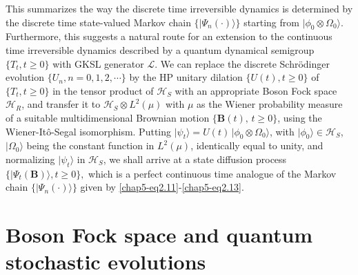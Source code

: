 This summarizes the way the discrete time irreversible dynamics  is determined by the discrete time state-valued Markov chain $\{\vert\Psi_n(\cdot)\rangle\}$ starting from $\vert\phi_0 \otimes \Omega_0\rangle$.  Furthermore, this suggests a natural route for an extension to the continuous time irreversible dynamics described by a quantum dynamical semigroup $\{T_t, t\geq 0\}$ with GKSL generator $\mathcal{L}$. We can replace the discrete Schr{\"o}dinger evolution $\{U_n, n=0,1,2,\cdots\}$ by the HP unitary dilation $\{U(t), t\geq 0\}$ of $\{T_t, t\geq 0\}$ in the tensor product of $\mathcal{H}_S$ with an appropriate Boson Fock space $\mathcal{H}_R$, and transfer it to $\mathcal{H}_S\otimes L^2(\mu)$ with $\mu$ as the Wiener probability measure of a suitable multidimensional Brownian motion $\{\mathbf{B}(t),\, t\geq 0\}$, using the Wiener-It{\^o}-Segal isomorphism. Putting $\vert\psi_t\rangle=U(t)\, \vert \phi_0\otimes \Omega_0\rangle$, with $\vert\phi_0\rangle\in \mathcal{H}_S$, $\vert\Omega_0\rangle$ being the constant function in $L^2(\mu)$, identically equal to unity, and  normalizing $\vert\psi_t\rangle$ in $\mathcal{H}_S$, we shall arrive at a state diffusion process $\{\vert \Psi_t(\mathbf{B})\rangle, t\geq 0\},$ which is a perfect continuous time analogue of the Markov chain $\{\vert \Psi_n(\cdot )\rangle\}$ given by \eqref{chap5-eq2.11}-\eqref{chap5-eq2.13}.

\section{Boson Fock space and quantum stochastic evolutions}\label{chap5-sec3}

